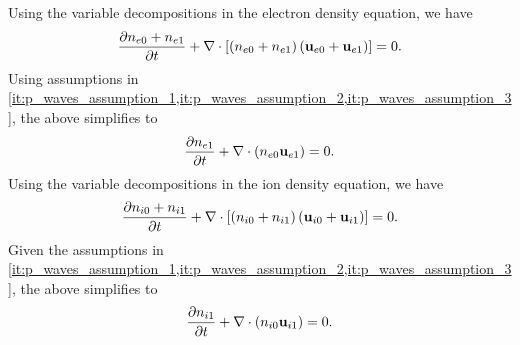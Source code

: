 \documentclass[a4paper,11pt]{report}
\begin{document}
Using the variable decompositions in the electron density equation, we have
\begin{equation*}
    \frac{\partial n_{e0} + n_{e1}}{\partial t} + \nabla \cdot \left [ \left ( n_{e0} + n_{e1} \right )  \left ( \mathbf{u}_{e0} + \mathbf{u}_{e1} \right ) \right ] = 0.
\end{equation*}
Using assumptions in \cref{it:p_waves_assumption_1,it:p_waves_assumption_2,it:p_waves_assumption_3}, the above simplifies to
\begin{equation}
    \label{eq:p_waves_e_den_linearized}
    \frac{\partial n_{e1}}{\partial t} + \nabla \cdot \left (n_{e0} \mathbf{u}_{e1} \right ) = 0.
\end{equation}
Using the variable decompositions in the ion density equation, we have
\begin{equation*}
    \frac{\partial n_{i0} + n_{i1}}{\partial t} + \nabla \cdot \left [ \left ( n_{i0} + n_{i1} \right )  \left ( \mathbf{u}_{i0} + \mathbf{u}_{i1} \right ) \right ] = 0.
\end{equation*}
Given the assumptions in \cref{it:p_waves_assumption_1,it:p_waves_assumption_2,it:p_waves_assumption_3}, the above simplifies to
\begin{equation}
    \label{eq:p_waves_i_den_linearized}
    \frac{\partial n_{i1}}{\partial t} + \nabla \cdot \left (n_{i0} \mathbf{u}_{i1} \right ) = 0.
\end{equation}
\end{document}
